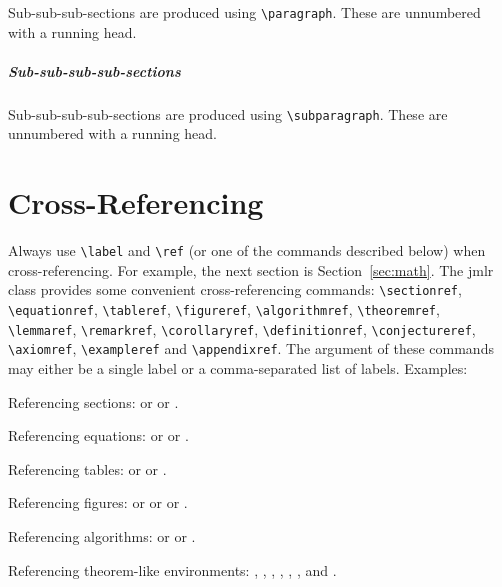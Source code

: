 \documentclass[pmlr]{jmlr}%
\begin{document}
Sub-sub-sub-sections are produced using \verb|\paragraph|.
These are unnumbered with a running head.

\subparagraph{Sub-sub-sub-sub-sections}

Sub-sub-sub-sub-sections are produced using \verb|\subparagraph|.
These are unnumbered with a running head.

\section{Cross-Referencing}

Always use \verb|\label| and \verb|\ref| (or one of the commands
described below) when cross-referencing.  For example, the next
section is Section~\ref{sec:math}. The \textsf{jmlr} class
provides some convenient cross-referencing commands:
\verb|\sectionref|, \verb|\equationref|, \verb|\tableref|,
\verb|\figureref|, \verb|\algorithmref|, \verb|\theoremref|,
\verb|\lemmaref|, \verb|\remarkref|, \verb|\corollaryref|,
\verb|\definitionref|, \verb|\conjectureref|, \verb|\axiomref|,
\verb|\exampleref| and \verb|\appendixref|. The argument of these
commands may either be a single label or a comma-separated list
of labels. Examples:

Referencing sections:  or
 or
.

Referencing equations:  or
 or
.

Referencing tables:  or
 or
.

Referencing figures:  or
 or
 or
.

Referencing algorithms:  or
 or
.

Referencing theorem-like environments: ,
, , 
, ,
,  and
.
\end{document}
